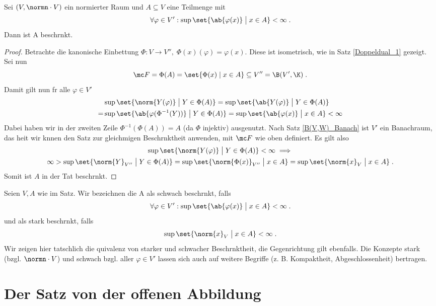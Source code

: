 \begin{theorem}
	Sei \((V,\normn\cdot V)\) ein normierter Raum und \(A\subseteq V\) eine Teilmenge mit
	\[\forall \varphi \in V': \sup\set{\ab{\varphi(x)} \;\big\vert\; x\in A}<\infty\;.\]
	Dann ist A beschr\as nkt.
\end{theorem}
\begin{proof}
	Betrachte die kanonische Einbettung \(\Phi: V \to V'',\; \Phi(x)(\varphi) = \varphi(x)\). Diese ist isometrisch, wie in Satz \ref{Doppeldual_1} gezeigt. Sei nun 
	\[\mc F = \Phi(A) = \set{\Phi(x)\;\vert\;x \in A} \subseteq V'' = \B(V',\K)\;.\]
	Damit gilt nun  f\us r alle \(\varphi\in V'\)
	\begin{align*}
		& \sup \set{\norm{Y(\varphi)} \;\big\vert\; Y\in \Phi(A)} = \sup \set{\ab{Y(\varphi)} \;\big\vert\; Y\in \Phi(A)} \\
		 =& \sup \set{\ab{\varphi(\Phi^{-1}(Y))} \;\big\vert\; Y\in \Phi(A)} =  \sup \set{\ab{\varphi(x)} \;\big\vert\; x\in A} < \infty
	\end{align*}
	Dabei haben wir in der zweiten Zeile \(\Phi^{-1}(\Phi(A)) = A\) (da \(\Phi\) injektiv) ausgenutzt. Nach Satz \ref{B(V,W)_Banach} ist \(V'\) ein Banachraum, das hei\s t wir k\os nnen den Satz zur gleichm\as \s igen Beschr\as nktheit anwenden, mit \(\mc F \) wie oben definiert. Es gilt also
	\begin{multline*} 
		\sup \set{\norm{Y(\varphi)} \;\big\vert\; Y\in \Phi(A)} <\infty\implies  \\
		\infty > \sup \set{\norm{Y}_{V''} \;\big\vert\; Y\in \Phi(A)} =  \sup \set{\norm{\Phi(x)}_{V''} \;\big\vert\; x\in A} =  \sup \set{\norm{x}_V \;\big\vert\; x\in A}\;.
	\end{multline*}
	Somit ist \(A\) in der Tat beschr\as nkt.
\end{proof}
\begin{rem}
	Seien \(V, A\) wie im Satz. Wir bezeichnen die A als schwach beschr\as nkt, falls
	\[\forall \varphi \in V': \sup\set{\ab{\varphi(x)} \;\big\vert\; x\in A}<\infty\;.\]
	und als stark beschr\as nkt, falls
	\[\sup \set{\norm{x}_V \;\big\vert\; x\in A} < \infty\;.\]
	Wir zeigen hier tats\as chlich die \As quivalenz von starker und schwacher Beschr\as nktheit, die Gegenrichtung gilt ebenfalls. Die Konzepte stark (bzgl. \(\normn\cdot V\)) und schwach bzgl. aller \(\varphi\in V'\) lassen sich auch auf weitere Begriffe (z. B. Kompaktheit, Abgeschlossenheit) \us bertragen.
\end{rem}

\section{Der Satz von der offenen Abbildung}

